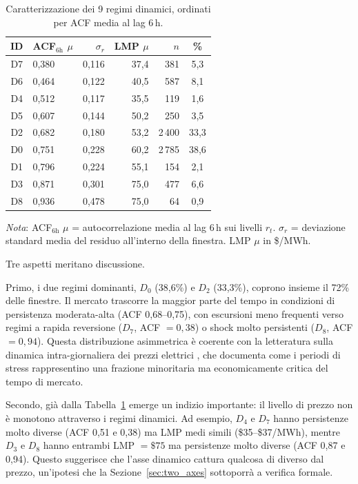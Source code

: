 \documentclass[12pt]{article}
\begin{document}
\begin{table}[H]
\centering
\caption{Caratterizzazione dei 9 regimi dinamici, ordinati per ACF media al lag 6\,h.}
\label{tab:dynamic_regimes}
\small
\setlength{\tabcolsep}{4pt}
\begin{tabular}{clrrrc}
\toprule
ID & ACF$_\text{6h}$ $\mu$ & $\sigma_r$ & LMP $\mu$ & $n$ & \% \\
\midrule
D7 & 0,380 & 0,116 & 37,4 &  381 &  5,3 \\
D6 & 0,464 & 0,122 & 40,5 &  587 &  8,1 \\
D4 & 0,512 & 0,117 & 35,5 &  119 &  1,6 \\
D5 & 0,607 & 0,144 & 50,2 &  250 &  3,5 \\
D2 & 0,682 & 0,180 & 53,2 & 2\,400 & 33,3 \\
D0 & 0,751 & 0,228 & 60,2 & 2\,785 & 38,6 \\
D1 & 0,796 & 0,224 & 55,1 &  154 &  2,1 \\
D3 & 0,871 & 0,301 & 75,0 &  477 &  6,6 \\
D8 & 0,936 & 0,478 & 75,0 &   64 &  0,9 \\
\bottomrule
\end{tabular}

\medskip
\small
\textit{Nota}: ACF$_\text{6h}$ $\mu$ = autocorrelazione media al lag 6\,h sui livelli $r_t$. $\sigma_r$ = deviazione standard media del residuo all'interno della finestra. LMP $\mu$ in \$/MWh.
\end{table}

Tre aspetti meritano discussione.

Primo, i due regimi dominanti, $D_0$ (38,6\%) e $D_2$ (33,3\%), coprono insieme il 72\% delle finestre.
Il mercato trascorre la maggior parte del tempo in condizioni di persistenza moderata-alta (ACF 0,68--0,75), con escursioni meno frequenti verso regimi a rapida reversione ($D_7$, ACF $= 0{,}38$) o shock molto persistenti ($D_8$, ACF $= 0{,}94$).
Questa distribuzione asimmetrica è coerente con la letteratura sulla dinamica intra-giornaliera dei prezzi elettrici \citep{karakatsani2008}, che documenta come i periodi di stress rappresentino una frazione minoritaria ma economicamente critica del tempo di mercato.

Secondo, già dalla Tabella~\ref{tab:dynamic_regimes} emerge un indizio importante: il livello di prezzo non è monotono attraverso i regimi dinamici.
Ad esempio, $D_4$ e $D_7$ hanno persistenze molto diverse (ACF 0,51 e 0,38) ma LMP medi simili (\$35--\$37/MWh), mentre $D_3$ e $D_8$ hanno entrambi LMP $= \$75$ ma persistenze molto diverse (ACF 0,87 e 0,94).
Questo suggerisce che l'asse dinamico cattura qualcosa di diverso dal prezzo, un'ipotesi che la Sezione~\ref{sec:two_axes} sottoporrà a verifica formale.
\end{document}
